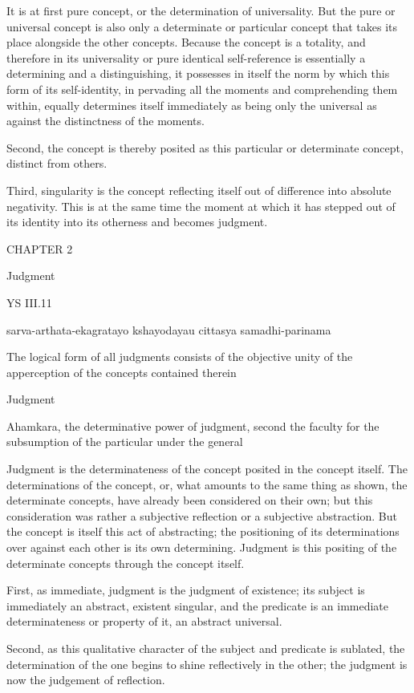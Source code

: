 It is at first pure concept,
or the determination of universality.
But the pure or universal concept is also
only a determinate or particular concept
that takes its place alongside the other concepts.
Because the concept is a totality,
and therefore in its universality
or pure identical self-reference
is essentially a determining and a distinguishing,
it possesses in itself the norm
by which this form of its self-identity,
in pervading all the moments
and comprehending them within,
equally determines itself immediately
as being only the universal
as against the distinctness of the moments.

Second, the concept is thereby posited
as this particular or determinate concept,
distinct from others.

Third, singularity is the concept reflecting itself
out of difference into absolute negativity.
This is at the same time the moment at which
it has stepped out of its identity
into its otherness and becomes judgment.

CHAPTER 2

Judgment

YS III.11

    sarva-arthata-ekagratayo kshayodayau cittasya samadhi-parinama

    The logical form of all judgments consists of the objective unity
    of the apperception of the concepts contained therein

    Judgment

    Ahamkara, the determinative power of judgment,
    second the faculty for the subsumption of the particular under the general

Judgment is the determinateness of the concept
posited in the concept itself.
The determinations of the concept,
or, what amounts to the same thing as shown,
the determinate concepts,
have already been considered on their own;
but this consideration was rather
a subjective reflection
or a subjective abstraction.
But the concept is itself this act of abstracting;
the positioning of its determinations over
against each other is its own determining.
Judgment is this positing of the determinate concepts
through the concept itself.

First, as immediate, judgment is the judgment of existence;
its subject is immediately an abstract, existent singular,
and the predicate is an immediate determinateness or property of it,
an abstract universal.

Second, as this qualitative character of
the subject and predicate is sublated,
the determination of the one begins
to shine reflectively in the other;
the judgment is now the judgement of reflection.

